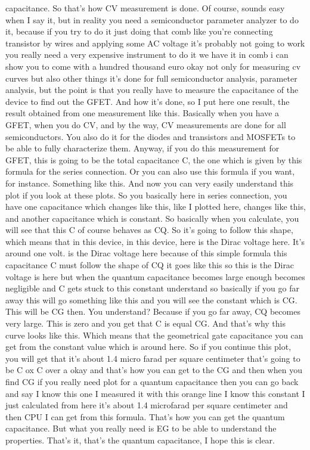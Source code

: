 capacitance. So that's how CV measurement is done. Of course, sounds easy when I say it, but in reality you need a semiconductor parameter analyzer to do it, because if you try to do it just doing that comb like you're connecting transistor by wires and applying some AC voltage it's probably not going to work you really need a very expensive instrument to do it we have it in comb i can show you to come with a hundred thousand euro okay not only for measuring cv curves but also other things it's done for full semiconductor analysis, parameter analysis, but the point is that you really have to measure the capacitance of the device to find out the GFET. And how it's done, so I put here one result, the result obtained from one measurement like this. Basically when you have a GFET, when you do CV, and by the way, CV measurements are done for all semiconductors. You also do it for the diodes and transistors and MOSFETs to be able to fully characterize them. Anyway, if you do this measurement for GFET, this is going to be the total capacitance C, the one which is given by this formula for the series connection. Or you can also use this formula if you want, for instance. Something like this. And now you can very easily understand this plot if you look at these plots. So you basically here in series connection, you have one capacitance which changes like this, like I plotted here, changes like this, and another capacitance which is constant. So basically when you calculate, you will see that this C of course behaves as CQ. So it's going to follow this shape, which means that in this device, in this device, here is the Dirac voltage here. It's around one volt. is the Dirac voltage here because of this simple formula this capacitance C must follow the shape of CQ it goes like this so this is the Dirac voltage is here but when the quantum capacitance becomes large enough becomes negligible and C gets stuck to this constant understand so basically if you go far away this will go something like this and you will see the constant which is CG. This will be CG then. You understand? Because if you go far away, CQ becomes very large. This is zero and you get that C is equal CG. And that's why this curve looks like this. Which means that the geometrical gate capacitance you can get from the constant value which is around here. So if you continue this plot, you will get that it's about 1.4 micro farad per square centimeter that's going to be C ox C over a okay and that's how you can get to the CG and then when you find CG if you really need plot for a quantum capacitance then you can go back and say I know this one I measured it with this orange line I know this constant I just calculated from here it's about 1.4 microfarad per square centimeter and then CPU I can get from this formula. That's how you can get the quantum capacitance. But what you really need is EG to be able to understand the properties. That's it, that's the quantum capacitance, I hope this is clear.
